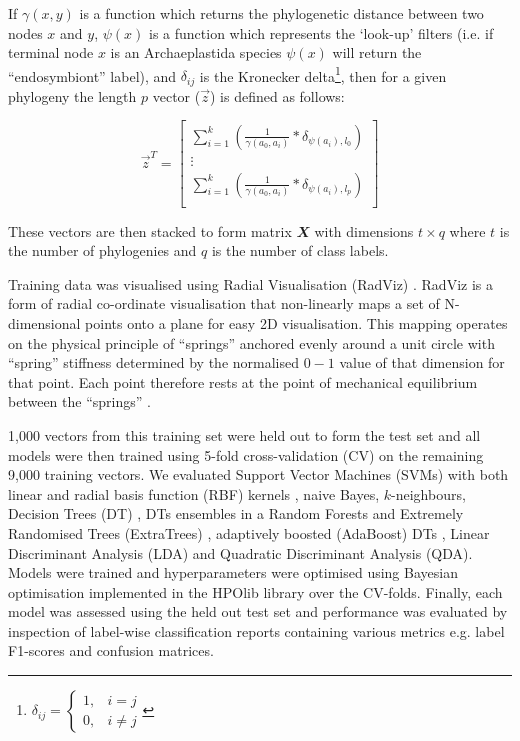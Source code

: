 If \(\gamma(x,y)\) 
is a function which returns the phylogenetic distance between two 
nodes \(x\) and \(y\), \(\psi(x)\) is a function which represents the `look-up' filters
(i.e. if terminal node \(x\) is an Archaeplastida species \(\psi(x)\) will return the ``endosymbiont'' label),
and \(\delta_{ij}\) is the Kronecker delta\footnote{
    \(\delta_{ij}= \begin{cases}
	1, &  i = j\\
	0, & i \neq j 
    \end{cases} \)}, then for a given phylogeny the length \(p\) vector (\(\vec{z}\)) is
defined as follows:

\begin{center}
	\[
        \vec{z}^{T} = \begin{bmatrix}
            \sum_{i=1}^k \left( \frac{1}{\gamma(a_{0},a_{i})} * \delta_{\psi(a_{i}),l_{0}} \right) \\
            \vdots \\
            \sum_{i=1}^k \left( \frac{1}{\gamma(a_{0},a_{i})} * \delta_{\psi(a_{i}),l_{p}} \right)\\
        \end{bmatrix}
	\]
\end{center}

These vectors are then stacked to form matrix \(\mathbfit{X}\) with dimensions \(t \times q\) where \(t\)
is the number of phylogenies and \(q\) is the number of class labels. 

Training data was visualised using Radial Visualisation (RadViz) \citep{Hoffman1997,Fayyad2001}.
RadViz is a form of radial co-ordinate visualisation that non-linearly maps a set of N-dimensional 
points onto a plane for easy 2D visualisation. This mapping operates on the physical principle
of ``springs'' anchored evenly around a unit circle with ``spring'' stiffness determined by 
the normalised \(0-1\) value of that dimension for that point.  Each point therefore rests
at the point of mechanical equilibrium between the ``springs'' \citep{NovakovaLenkaandStepankova2006}.

1,000 vectors from this training set were held out to form the test set and all models were then trained
using 5-fold cross-validation (CV) on the remaining 9,000 training vectors. 
We evaluated Support Vector Machines (SVMs) with both linear and radial basis function (RBF) kernels
\citep{Vapnik1963}, naive Bayes, \(k\)-neighbours, 
Decision Trees (DT) \citep{Quinlan1986}, DTs ensembles in a Random Forests \citep{Breiman2001}
and Extremely Randomised Trees (ExtraTrees) \citep{Geurts2006},
adaptively boosted (AdaBoost) DTs \citep{Freund1997}, Linear Discriminant Analysis (LDA) and
Quadratic Discriminant Analysis (QDA).
Models were trained and hyperparameters were optimised 
using Bayesian optimisation 
implemented in the HPOlib library \citep{Eggensperger2013,Komer2014} over the CV-folds.  
Finally, each model was assessed using the held out test set and performance was 
evaluated by inspection of label-wise classification reports containing various
metrics e.g. label F1-scores and confusion matrices.
 
